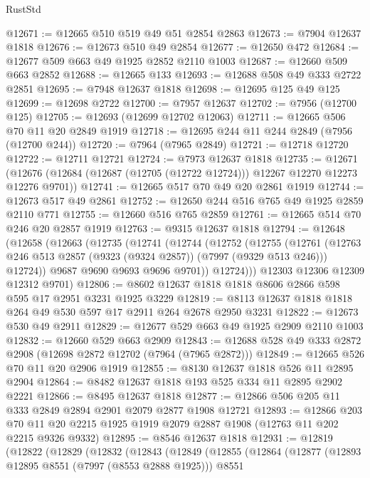 \begin{lexlean}{RustStd}
\begin{coremodule}
@12671 := @12665 @510 @519 @49 @51 @2854 @2863
@12673 := @7904 @12637 @1818
@12676 := @12673 @510 @49 @2854
@12677 := @12650 @472
@12684 := @12677 @509 @663 @49 @1925 @2852 @2110 @1003
@12687 := @12660 @509 @663 @2852
@12688 := @12665 @133
@12693 := @12688 @508 @49 @333 @2722 @2851
@12695 := @7948 @12637 @1818
@12698 := @12695 @125 @49 @125
@12699 := @12698 @2722
@12700 := @7957 @12637
@12702 := @7956 (@12700 @125)
@12705 := @12693 (@12699 @12702 @12063)
@12711 := @12665 @506 @70 @11 @20 @2849 @1919
@12718 := @12695 @244 @11 @244 @2849 (@7956 (@12700 @244))
@12720 := @7964 (@7965 @2849)
@12721 := @12718 @12720
@12722 := @12711 @12721
@12724 := @7973 @12637 @1818
@12735 := @12671
    (@12676 (@12684 (@12687 (@12705 (@12722 @12724))) @12267 @12270 @12273 @12276 @9701))
@12741 := @12665 @517 @70 @49 @20 @2861 @1919
@12744 := @12673 @517 @49 @2861
@12752 := @12650 @244 @516 @765 @49 @1925 @2859 @2110 @771
@12755 := @12660 @516 @765 @2859
@12761 := @12665 @514 @70 @246 @20 @2857 @1919
@12763 := @9315 @12637 @1818
@12794 := @12648
    (@12658
      (@12663
        (@12735
          (@12741
            (@12744
              (@12752
                (@12755
                  (@12761
                    (@12763 @246 @513 @2857 (@9323 (@9324 @2857)) (@7997 (@9329 @513 @246)))
                    @12724))
                @9687
                @9690
                @9693
                @9696
                @9701))
            @12724)))
      @12303
      @12306
      @12309
      @12312
      @9701)
@12806 := @8602 @12637 @1818 @1818 @8606 @2866 @598 @595 @17 @2951 @3231 @1925 @3229
@12819 := @8113 @12637 @1818 @1818 @264 @49 @530 @597 @17 @2911 @264 @2678 @2950 @3231
@12822 := @12673 @530 @49 @2911
@12829 := @12677 @529 @663 @49 @1925 @2909 @2110 @1003
@12832 := @12660 @529 @663 @2909
@12843 := @12688 @528 @49 @333 @2872 @2908 (@12698 @2872 @12702 (@7964 (@7965 @2872)))
@12849 := @12665 @526 @70 @11 @20 @2906 @1919
@12855 := @8130 @12637 @1818 @526 @11 @2895 @2904
@12864 := @8482 @12637 @1818 @193 @525 @334 @11 @2895 @2902 @2221
@12866 := @8495 @12637 @1818
@12877 := @12866 @506 @205 @11 @333 @2849 @2894 @2901 @2079 @2877 @1908 @12721
@12893 := @12866
    @203
    @70
    @11
    @20
    @2215
    @1925
    @1919
    @2079
    @2887
    @1908
    (@12763 @11 @202 @2215 @9326 @9332)
@12895 := @8546 @12637 @1818
@12931 := @12819
    (@12822
      (@12829
        (@12832
          (@12843
            (@12849
              (@12855
                (@12864
                  (@12877
                    (@12893 @12895 @8551 (@7997 (@8553 @2888 @1925)))
                    @8551

\end{coremodule}
\end{lexlean}
